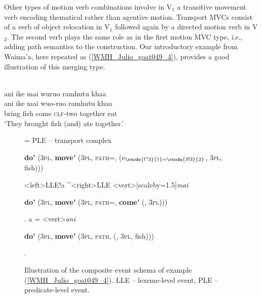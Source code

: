 Other types of motion verb combinations involve in V$_1$ a transitive movement verb encoding thematical rather than agentive motion. Transport MVCs consist of a verb of object relocation in V$_1$ followed again by a directed motion verb in V$_2$. The second verb plays the same role as in the first motion MVC type, i.e., adding path semantics to the construction. Our introductory example from Waima'a, here repeated as (\ref{WMH_Julio_goat049_4}), provides a good illustration of this merging type.

\ea \label{WMH_Julio_goat049_4}
\\
\glll ani ike mai wuruo ramhutu khaa \\
ani ike mai wuo-ruo ramhutu khaa \\
bring fish come \textsc{clf}-two together eat\\
\glft `They brought fish (and) ate together.' \\ 
\z

\begin{figure}
\jtree[xunit=9.5em,yunit=2em]
\! = {PLE -- transport complex}{\begin{scriptsize}\textbf{do'} (3\textsc{pl}, \textbf{move'} (3\textsc{pl}, \textsc{path=}, \textbf{} (e$_{\rnode{C3}{1}=\rnode{B3}{2}}$, 3\textsc{pl}, fish)))\end{scriptsize}}
<left>{LLE}!a ^<right>{LLE}
<vert>[scaleby=1.5]{\textit{mai}}{\begin{scriptsize} \textbf{do'} (3\textsc{pl}, \textbf{move'} (3\textsc{pl}, \textsc{path=}, \textbf{come'} (, 3\textsc{pl})))\end{scriptsize}}.
\!a = <vert>{\textit{ani}}
{\begin{scriptsize} \textbf{do'} (3\textsc{pl}, \textbf{move'} (3\textsc{pl}, \textsc{path}, \textbf{} (, 3\textsc{pl}, fish)))\end{scriptsize}}.
\endjtree

\caption[Event schema illustration of example (\ref{WMH_Julio_goat049_4})]{Illustration of the composite event schema of example (\ref{WMH_Julio_goat049_4}). LLE -- lexeme-level event, PLE -- predicate-level event.}
\label{figure:eventschema_WP2}
\end{figure}

